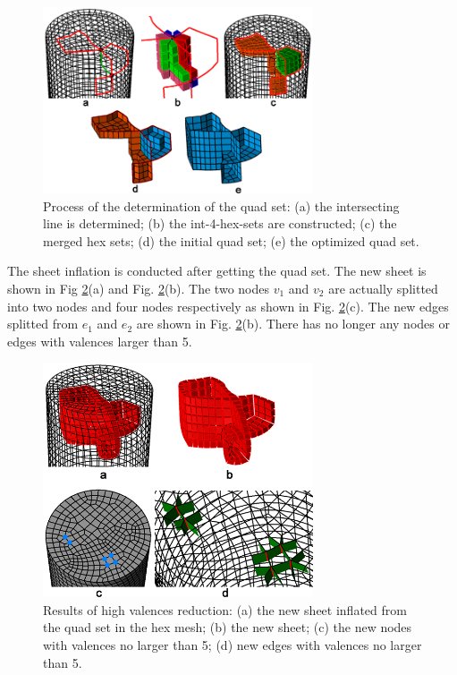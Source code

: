\documentclass[final,5p,times,twocolumn]{elsarticle}
\begin{document}
\begin{figure}[htbp]
\begin{center}
\includegraphics[width=8cm]{figures/exam2_quad_set.png}
\caption{Process of the determination of the quad set: (a) the intersecting line is determined; (b) the int-4-hex-sets are constructed; (c) the merged hex sets; (d) the initial quad set; (e) the optimized quad set.}
\label{fig:exam2_quad_set}
\end{center}
\end{figure}

The sheet inflation is conducted after getting the quad set. The new sheet is shown in Fig \ref{fig:exam2_sheet}(a) and Fig. \ref{fig:exam2_sheet}(b). The two nodes $v_1$ and $v_2$ are actually splitted into two nodes and four nodes respectively as shown in Fig. \ref{fig:exam2_sheet}(c). The new edges splitted from $e_1$ and $e_2$ are shown in Fig. \ref{fig:exam2_sheet}(b). There has no longer any nodes or edges with valences larger than 5.

\begin{figure}[htbp]
\begin{center}
\includegraphics[width=8cm]{figures/exam2_sheet.png}
\caption{Results of high valences reduction: (a) the new sheet inflated from the quad set in the hex mesh; (b) the new sheet; (c) the new nodes with valences no larger than 5; (d) new edges with valences no larger than 5.}
\label{fig:exam2_sheet}
\end{center}
\end{figure}
\end{document}
